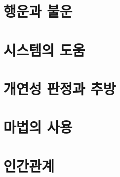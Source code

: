 \documentclass{report}
\begin{document}
	\section{행운과 불운}
		
	
	\section{시스템의 도움}
		
	
	\section{개연성 판정과 추방}
		
	
	\section{마법의 사용}
		
	
	\section{인간관계}
		
	
\end{document}
